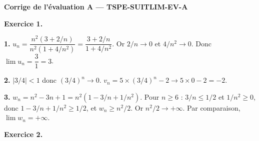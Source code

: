 %
%
%
%

\textbf{Corrige de l'évaluation A — TSPE-SUITLIM-EV-A}

\bigskip


\textbf{Exercice 1.}

\textbf{1.} $u_n = \dfrac{n^2(3 + 2/n)}{n^2(1 + 4/n^2)} = \dfrac{3 + 2/n}{1 + 4/n^2}$. Or $2/n \to 0$ et $4/n^2 \to 0$. Donc $\lim u_n = \dfrac{3}{1} = \boxed{3}$.

\textbf{2.} $|3/4| < 1$ donc $(3/4)^n \to 0$. $v_n = 5 \times (3/4)^n - 2 \to 5 \times 0 - 2 = \boxed{-2}$.

\textbf{3.} $w_n = n^2 - 3n + 1 = n^2(1 - 3/n + 1/n^2)$. Pour $n \geq 6$ : $3/n \leq 1/2$ et $1/n^2 \geq 0$, donc $1 - 3/n + 1/n^2 \geq 1/2$, et $w_n \geq n^2/2$. Or $n^2/2 \to +\infty$. Par comparaison, $\boxed{\lim w_n = +\infty}$.

\bigskip


\textbf{Exercice 2.}

